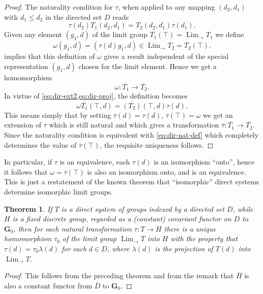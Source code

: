 \documentclass[11pt,a4paper]{report}
\newtheorem{theorem}{Theorem}
\DeclareMathOperator{\Lim}{Lim}
\begin{document}
\begin{proof}
	The naturality condition for $\tau$, when applied to any mapping $(d_2,d_1)$ with $d_1\le d_2$ in the directed set $D$ reads
	\begin{equation}\label{eq:dir-nat}
		\tau(d_2)T_1(d_2,d_1)=T_2(d_2,d_1)\tau(d_1).
	\end{equation}
	Given any element $(g_1,d)$ of the limit group $\overline{T_1}(\top)=\Lim_{\rightarrow} T_1$ we define
	\begin{equation}\label{eq:dir-nat-def}
		\omega(g_1,d)=(\tau(d) g_1, d)\in \Lim_{\rightarrow} T_2 = \overline{T_2}(\top).
	\end{equation}
	 implies that this definition of $\omega$ gives a result independent of the special representation $(g_1,d)$
	chosen for the limit element. Hence we get a homomorphism
	\begin{equation*}
		\omega:\overline{T_1}\rightarrow\overline{T_2}.
	\end{equation*}
	In virtue of \cref{eq:dir-ext2,eq:dir-proj}, the definition  becomes
	\begin{equation}\label{eq:dir-nat-def2}
		\omega\overline{T_1}(\top,d)=\overline{(T_2)}(\top,d)\tau(d).
	\end{equation}
	This means simply that by setting $\overline{\tau}(d)=\tau(d)$, $\overline{\tau}(\top)=\omega$ we get an extension of $\tau$
	which is still natural and which gives a transformation $\overline{\tau}:\overline{T_1}\rightarrow\overline{T_2}$. Since
	the naturality condition  is equivalent with \cref{eq:dir-nat-def} which completely determines the
	value of $\overline{\tau}(\top)$, the requisite uniqueness follows.
\end{proof}
In particular, if $\tau$ is an equivalence, each $\tau(d)$ is an isomorphism ``onto'', hence it follows that
$\omega=\overline{\tau}(\top)$ is also an isomorphism onto, and is an equivalence. This is just a restatement of the known
theorem that ``isomorphic'' direct systems determine isomorphic limit groups.
\begin{theorem}\label{thm:dir-const}
	If $T$ is a direct system of groups indexed by a directed set $D$, while $H$ is a fixed discrete group, regarded as a
	(constant) covariant functor on $D$ to $\mathbf{G}_0$, then for each natural transformation $\tau:T\rightarrow H$ there
	is a unique homomorphism $\tau_0$ of the limit group $\Lim_{\rightarrow} T$ into $H$ with the property that $\tau(d)=\tau_0\lambda(d)$
	for each $d\in D$, where $\lambda(d)$ is the projection of $T(d)$ into $\Lim_{\rightarrow} T$.
\end{theorem}
\begin{proof}
	This follows from the preceding theorem and from the remark that $\overline{H}$ is also a constant functor from $\overline{D}$
	to $\mathbf{G}_0$.
\end{proof}
\end{document}
